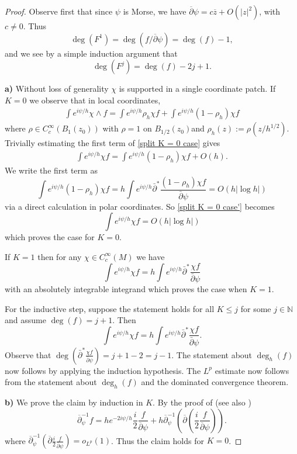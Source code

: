 \documentclass[12pt]{amsart}
\def\p{\partial}
\theoremstyle{definition}
\theoremstyle{remark}
\newcommand{\abs}[1]{\lvert #1 \rvert}
\newcommand{\ol}{\overline}
\newcommand{\op}{\overline \p}
\begin{document}
\begin{proof}
Observe first that since $\psi$ is Morse, we have $\op \psi=c\ol z+O(\abs{z}^2)$, with $c\neq 0$. Thus 
\[
 \deg(F^1)=\deg(f/\op \psi)=\deg(f)-1,
\]
and we see by a simple induction argument that
\[
 \deg(F^j)=\deg(f)-2j+1.
\]


{\color{black}
\textbf{a)} 
Without loss of generality $\chi$ is supported in a single coordinate patch. If $K = 0$ we observe that in local coordinates,
\begin{eqnarray}
\label{split K = 0 case}
\int e^{i\psi/h} \chi\wedge f = \int e^{i\psi/h} \rho_h \chi f + \int e^{i\psi/h} (1-\rho_h) \chi f
\end{eqnarray}
where $\rho\in C^\infty_c(B_1(z_0))$ with $\rho=1$ on $B_{1/2}(z_0)$and $\rho_h(z) := \rho(z/h^{1/2})$. Trivially estimating the first term of \eqref{split K = 0 case} gives
\begin{eqnarray}
\label{split K = 0 case'}
\int e^{i\psi/h} \chi f =  \int e^{i\psi/h} (1-\rho_h) \chi f + O(h).
\end{eqnarray}
We write the first term as 
$$\int e^{i\psi/h}(1-\rho_h) \chi f = h\int e^{i\psi/h} \bar\partial^* \frac{ (1-\rho_h)\chi f}{\bar\partial \psi} = O(h|\log h|)$$
via a direct calculation in polar coordinates. So \eqref{split K = 0 case'} becomes
$$\int e^{i\psi/h} \chi f = O(h|\log h|)$$
which proves the case for $K = 0$.

If $K = 1$ then for any $\chi\in C^\infty_c(M)$ we have  
$$\int e^{i\psi/h} \chi f = h\int e^{i\psi/h} \bar\partial^* \frac{\chi f}{\bar\partial \psi}$$
with an absolutely integrable integrand which proves the case when $K = 1$.

For the inductive step, suppose the statement holds for all $K\leq j$ for some $j\in \mathbb N$ and assume $\deg(f) = j+1$. Then 
$$\int e^{i\psi/h} \chi f = h\int e^{i\psi/h} \bar\partial^* \frac{\chi f}{\bar\partial \psi}.$$
Observe that $\deg (\bar\partial^* \frac{\chi f}{\bar\partial \psi}) = j+1-2 = j-1$. The statement about $\deg_h(f)$ now follows by applying the induction hypothesis. The $L^p$ estimate now follows from the statement about $\deg_h(f)$ and the dominated convergence theorem.



}

\noindent \textbf{b)} We prove the claim by induction in $K$. By the proof of \cite[Proposition 2.7]{imanuvilov2010calderon} (see also \cite[Proposition 3.4]{imanuvilov2012partial})
\[
 \op_{\psi}^{-1}f=he^{-2i\psi/h} \frac{i}{2}\frac{f}{\op \psi} +h  \op^{-1}_{\psi}\left(\op \left(\frac{i}{2}\frac{f}{\op \psi}\right)\right).
\]
where $\op^{-1}_{\psi}(\op \frac{i}{2}\frac{f}{\op \psi})=o_{L^p}(1)$. Thus the claim holds for $K=0$.


\end{proof}
\end{document}
